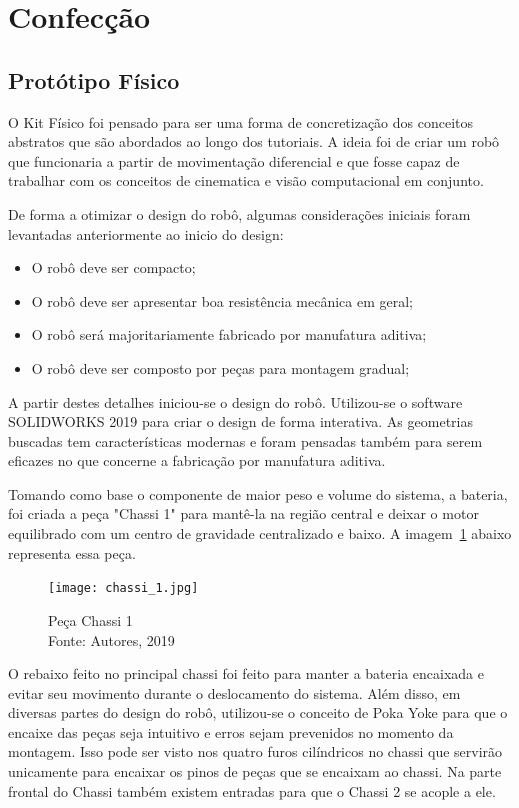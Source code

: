 \section{Confecção}
\subsection{Protótipo Físico}
O Kit Físico foi pensado para ser uma forma de concretização dos conceitos abstratos que são abordados ao longo dos tutoriais. A ideia foi de criar um robô que funcionaria a partir de movimentação diferencial e que fosse capaz de trabalhar com os conceitos de cinematica e visão computacional em conjunto.

De forma a otimizar o design do robô, algumas considerações iniciais foram levantadas anteriormente ao inicio do design:

\begin{itemize}
	\item O robô deve ser compacto;
	\item O robô deve ser apresentar boa resistência mecânica em geral;
	\item O robô será majoritariamente fabricado por manufatura aditiva;
	\item O robô deve ser composto por peças para montagem gradual;
\end{itemize}
A partir destes detalhes iniciou-se o design do robô. Utilizou-se o software SOLIDWORKS 2019 para criar o design de forma interativa. As geometrias buscadas tem características modernas e foram pensadas também para serem eficazes no que concerne a fabricação por manufatura aditiva.

Tomando como base o componente de maior peso e volume do sistema, a bateria, foi criada a peça "Chassi 1" para mantê-la na região central e deixar o motor equilibrado com um centro de gravidade centralizado e baixo. A imagem~\ref{fig:chassi_1} abaixo representa essa peça.

\begin{figure}[h!]
	\centering
	\texttt{[image: chassi\_1.jpg]}\\
	\caption{Peça Chassi 1 \\ Fonte: Autores, 2019}
	\label{fig:chassi_1}
\end{figure}

O rebaixo feito no principal chassi foi feito para manter a bateria encaixada e evitar seu movimento durante o deslocamento do sistema. Além disso, em diversas partes do design do robô, utilizou-se o conceito de Poka Yoke para que o encaixe das peças seja intuitivo e erros sejam prevenidos no momento da montagem. Isso pode ser visto nos quatro furos cilíndricos no chassi que servirão unicamente para encaixar os pinos de peças que se encaixam ao chassi. Na parte frontal do Chassi também existem entradas para que o Chassi 2 se acople a ele.

